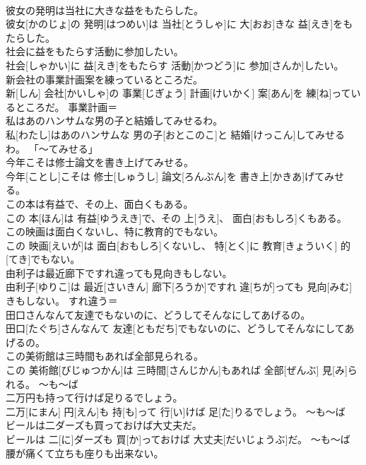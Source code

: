 \documentclass[8pt]{extreport}
\begin{document}
\begin{CJK}{UTF8}{min}
\\	彼女の発明は当社に大きな益をもたらした。	
\\	彼女[かのじょ]の 発明[はつめい]は 当社[とうしゃ]に 大[おお]きな 益[えき]をもたらした。	
\\	社会に益をもたらす活動に参加したい。	
\\	社会[しゃかい]に 益[えき]をもたらす 活動[かつどう]に 参加[さんか]したい。	
\\	新会社の事業計画案を練っているところだ。	
\\	新[しん] 会社[かいしゃ]の 事業[じぎょう] 計画[けいかく] 案[あん]を 練[ね]っているところだ。	事業計画＝ 
\\	私はあのハンサムな男の子と結婚してみせるわ。	
\\	私[わたし]はあのハンサムな 男の子[おとこのこ]と 結婚[けっこん]してみせるわ。	「〜てみせる」
\\	今年こそは修士論文を書き上げてみせる。	
\\	今年[ことし]こそは 修士[しゅうし] 論文[ろんぶん]を 書き上[かきあ]げてみせる。	
\\	この本は有益で、その上、面白くもある。	
\\	この 本[ほん]は 有益[ゆうえき]で、その 上[うえ]、 面白[おもしろ]くもある。	
\\	この映画は面白くないし、特に教育的でもない。	
\\	この 映画[えいが]は 面白[おもしろ]くないし、 特[とく]に 教育[きょういく] 的[てき]でもない。	
\\	由利子は最近廊下ですれ違っても見向きもしない。	
\\	由利子[ゆりこ]は 最近[さいきん] 廊下[ろうか]ですれ 違[ちが]っても 見向[みむ]きもしない。	すれ違う＝ 
\\	田口さんなんて友達でもないのに、どうしてそんなにしてあげるの。	
\\	田口[たぐち]さんなんて 友達[ともだち]でもないのに、どうしてそんなにしてあげるの。	
\\	この美術館は三時間もあれば全部見られる。	
\\	この 美術館[びじゅつかん]は 三時間[さんじかん]もあれば 全部[ぜんぶ] 見[み]られる。	〜も〜ば 
\\	二万円も持って行けば足りるでしょう。	
\\	二万[にまん] 円[えん]も 持[も]って 行[い]けば 足[た]りるでしょう。	〜も〜ば 
\\	ビールは二ダーズも買っておけば大丈夫だ。	
\\	ビールは 二[に]ダーズも 買[か]っておけば 大丈夫[だいじょうぶ]だ。	〜も〜ば 
\\	腰が痛くて立ちも座りも出来ない。	

\end{CJK}
\end{document}
